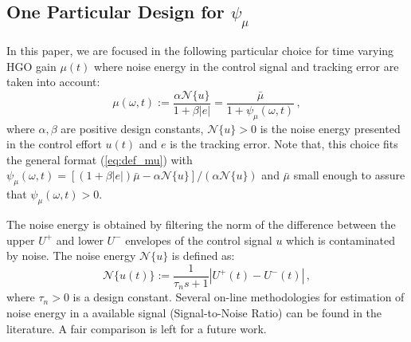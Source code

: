 \documentclass[letterpaper, 10 pt, conference]{ieeeconf}  %
\theoremstyle{plain}
\theoremstyle{definition}
\theoremstyle{remark}
\begin{document}
\subsection{One Particular Design for $\psi_\mu$}
%
%

In this paper, we are focused in the following particular choice for time varying HGO gain $\mu(t)$ where noise energy in the control signal and tracking error are taken into account: 
%
\begin{equation}
\mu(\omega,t):=\frac{\alpha \mathcal{N}\{u\}}{1+\beta |e|}=\frac{\bar{\mu}}{1+
\psi_\mu(\omega,t)}\,,\label{eq:def_mupratico}
\end{equation}
%
where $\alpha,\beta$ are positive design constants, $\mathcal{N}\{u\}>0$ is the noise energy presented in the control effort $u(t)$ and $e$ is the tracking error. Note that, this choice fits the general format (\ref{eq:def_mu}) with $\psi_\mu(\omega,t)=[(1+\beta |e|) \bar{\mu}-\alpha \mathcal{N}\{u\}]/(\alpha \mathcal{N}\{u\})$ and $\bar{\mu}$ small enough to assure that  $\psi_\mu(\omega,t)>0$. 

The noise energy is obtained by filtering the norm of the difference between 
the upper $U^{+}$ and lower $U^{-}$ envelopes of the control signal $u$ which is contaminated by noise. The noise energy $\mathcal{N}\{u\}$ is defined as:
%
%
$$\mathcal{N}\{u(t)\}:=\frac{1}{\tau_n s +1} \left|U^{+}(t)-U^{-}(t)\right|\,,$$
%
where $\tau_n>0$ is a design constant. Several  on-line methodologies for estimation of noise energy in a available signal (Signal-to-Noise Ratio) can be found in the literature. A fair comparison is left for a future work.  
\end{document}
